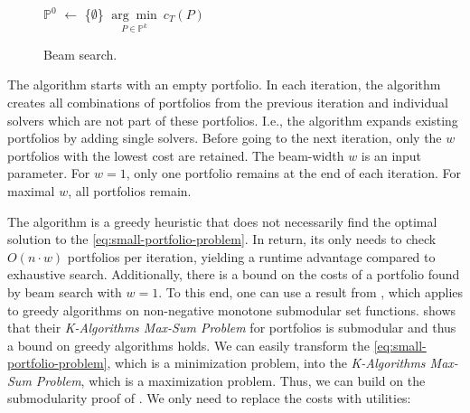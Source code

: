\documentclass[conference]{IEEEtran}
\begin{document}
\begin{figure}[t]
\makeatletter
\let\@latex@error\@gobble
\makeatother
\begin{algorithm}[H]
	$\mathbb{P}^0$ $\leftarrow$ \{$\emptyset$\}
	\Return $\underset{P \in \mathbb{P}^k}{\arg\min}~c_{T}(P)$\;
\end{algorithm}
\caption{Beam search.}
\label{al:beam-search}
\end{figure}

The algorithm starts with an empty portfolio.
In each iteration, the algorithm creates all combinations of portfolios from the previous iteration and individual solvers which are not part of these portfolios.
I.e., the algorithm expands existing portfolios by adding single solvers.
Before going to the next iteration, only the $w$ portfolios with the lowest cost are retained.
The beam-width $w$ is an input parameter.
For $w=1$, only one portfolio remains at the end of each iteration.
For maximal $w$, all portfolios remain.

The algorithm is a greedy heuristic that does not necessarily find the optimal solution to the \ref{eq:small-portfolio-problem}.
In return, its only needs to check $O(n \cdot w)$ portfolios per iteration, yielding a runtime advantage compared to exhaustive search.
Additionally, there is a bound on the costs of a portfolio found by beam search with $w=1$.
To this end, one can use a result from \cite{nemhauser1978analysis}, which applies to greedy algorithms on non-negative monotone submodular set functions.
\cite{nof2020real} shows that their \emph{K-Algorithms Max-Sum Problem} for portfolios is submodular and thus a bound on greedy algorithms holds.
We can easily transform the \ref{eq:small-portfolio-problem}, which is a minimization problem, into the \emph{K-Algorithms Max-Sum Problem}, which is a maximization problem.
Thus, we can build on the submodularity proof of \cite{nof2020real}.
We only need to replace the costs with utilities:
\end{document}
